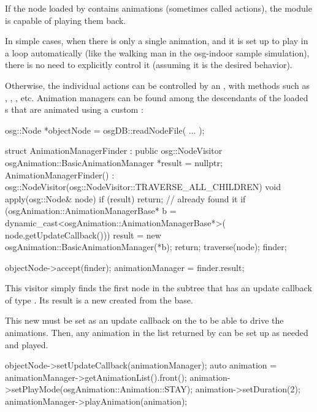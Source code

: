 If the node loaded by  contains animations (sometimes
called actions), the  module is capable of playing them back.

In simple cases, when there is only a single animation, and it is set up to play
in a loop automatically (like the walking man in the osg-indoor sample
simulation), there is no need to explicitly control it (assuming it is the
desired behavior).

Otherwise, the individual actions can be controlled by an
, with methods such as
, , , etc.
Animation managers can be found among the descendants of the loaded
s that are animated using a custom :

\begin{cpp}
osg::Node *objectNode = osgDB::readNodeFile( ... );

struct AnimationManagerFinder : public osg::NodeVisitor {
    osgAnimation::BasicAnimationManager *result = nullptr;
    AnimationManagerFinder()
      : osg::NodeVisitor(osg::NodeVisitor::TRAVERSE_ALL_CHILDREN) {}
    void apply(osg::Node& node) {
        if (result) return; // already found it
        if (osgAnimation::AnimationManagerBase* b =
              dynamic_cast<osgAnimation::AnimationManagerBase*>(
                node.getUpdateCallback())) {
            result = new osgAnimation::BasicAnimationManager(*b);
            return;
        }
        traverse(node);
    }
} finder;

objectNode->accept(finder);
animationManager = finder.result;
\end{cpp}

This visitor simply finds the first node in the subtree that has an update
callback of type . Its result is a
new  created from the base.

This new  must be set as an update callback on the
 to be able to drive the animations. Then, any animation in the
list returned by  can be set up as needed and played.

\begin{cpp}
objectNode->setUpdateCallback(animationManager);
auto animation = animationManager->getAnimationList().front();
animation->setPlayMode(osgAnimation::Animation::STAY);
animation->setDuration(2);
animationManager->playAnimation(animation);
\end{cpp}

